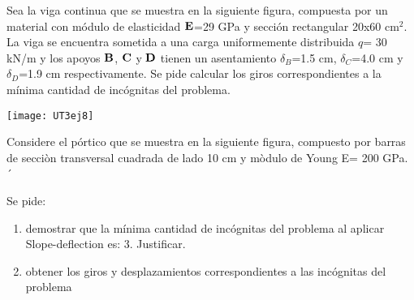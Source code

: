 \ejercicio

Sea la viga continua que se muestra en la siguiente figura, compuesta por un material con módulo de elasticidad $\bf E$=29 GPa y sección rectangular 20x60 cm$^2$. La viga se encuentra sometida a una carga uniformemente distribuida $q$= 30 kN/m y los apoyos $\bf B$, $\bf C$ y $\bf D$ tienen un asentamiento $\delta_B$=1.5 cm, $\delta_C$=4.0 cm y $\delta_D$=1.9 cm respectivamente. Se pide calcular los giros correspondientes a la mínima cantidad de incógnitas del problema.

\begin{center}
	\texttt{[image: UT3ej8]}
\end{center}

\ejercicio

Considere el pórtico que se muestra en la siguiente figura, compuesto por barras de secciòn transversal cuadrada de lado 10 cm y mòdulo de Young E= 200 GPa. 
´
\begin{center}
	 \def\svgwidth{0.7\textwidth}
	
\end{center}

Se pide:

\begin{enumerate}
	\item demostrar que la mínima cantidad de incógnitas del problema al aplicar Slope-deflection es: 3. Justificar.
	\item obtener los giros y desplazamientos correspondientes a las incógnitas del problema
\end{enumerate}
 
